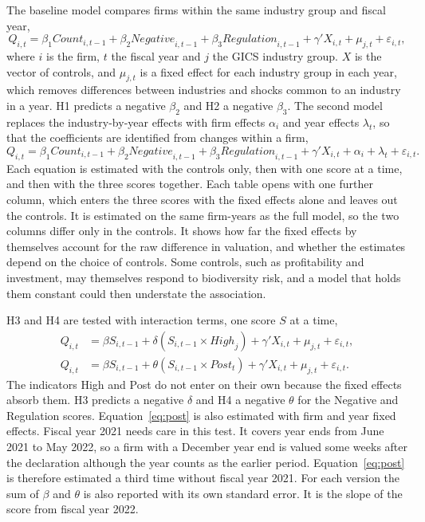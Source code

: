 \documentclass[12pt,a4paper]{article}
\begin{document}
The baseline model compares firms within the same industry group and fiscal year,
\begin{equation}
Q_{i,t} = \beta_1 \mathit{Count}_{i,t-1} + \beta_2 \mathit{Negative}_{i,t-1} + \beta_3 \mathit{Regulation}_{i,t-1} + \gamma' X_{i,t} + \mu_{j,t} + \varepsilon_{i,t},
\label{eq:baseline}
\end{equation}
where $i$ is the firm, $t$ the fiscal year and $j$ the GICS industry group. $X$ is the vector of controls, and $\mu_{j,t}$ is a fixed effect for each industry group in each year, which removes differences between industries and shocks common to an industry in a year. H1 predicts a negative $\beta_2$ and H2 a negative $\beta_3$. The second model replaces the industry-by-year effects with firm effects $\alpha_i$ and year effects $\lambda_t$, so that the coefficients are identified from changes within a firm,
\begin{equation}
Q_{i,t} = \beta_1 \mathit{Count}_{i,t-1} + \beta_2 \mathit{Negative}_{i,t-1} + \beta_3 \mathit{Regulation}_{i,t-1} + \gamma' X_{i,t} + \alpha_i + \lambda_t + \varepsilon_{i,t}.
\label{eq:firm}
\end{equation}
Each equation is estimated with the controls only, then with one score at a time, and then with the three scores together. Each table opens with one further column, which enters the three scores with the fixed effects alone and leaves out the controls. It is estimated on the same firm-years as the full model, so the two columns differ only in the controls. It shows how far the fixed effects by themselves account for the raw difference in valuation, and whether the estimates depend on the choice of controls. Some controls, such as profitability and investment, may themselves respond to biodiversity risk, and a model that holds them constant could then understate the association.

H3 and H4 are tested with interaction terms, one score $S$ at a time,
\begin{align}
Q_{i,t} &= \beta S_{i,t-1} + \delta \left( S_{i,t-1} \times \mathit{High}_{j} \right) + \gamma' X_{i,t} + \mu_{j,t} + \varepsilon_{i,t}, \label{eq:high}\\
Q_{i,t} &= \beta S_{i,t-1} + \theta \left( S_{i,t-1} \times \mathit{Post}_{t} \right) + \gamma' X_{i,t} + \mu_{j,t} + \varepsilon_{i,t}. \label{eq:post}
\end{align}
The indicators High and Post do not enter on their own because the fixed effects absorb them. H3 predicts a negative $\delta$ and H4 a negative $\theta$ for the Negative and Regulation scores. Equation~\eqref{eq:post} is also estimated with firm and year fixed effects. Fiscal year 2021 needs care in this test. It covers year ends from June 2021 to May 2022, so a firm with a December year end is valued some weeks after the declaration although the year counts as the earlier period. Equation~\eqref{eq:post} is therefore estimated a third time without fiscal year 2021. For each version the sum of $\beta$ and $\theta$ is also reported with its own standard error. It is the slope of the score from fiscal year 2022.
\end{document}
